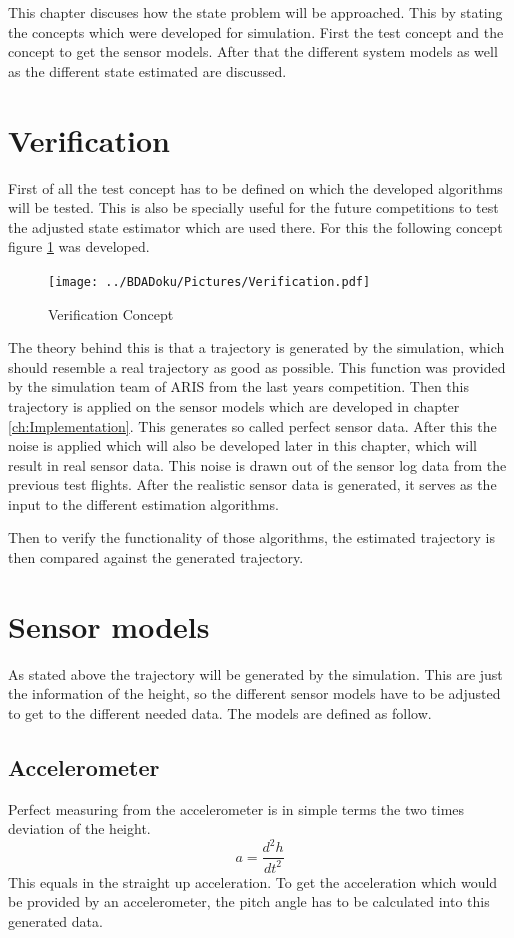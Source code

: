
  This chapter discuses how the state problem will be approached.
  This by stating the concepts which were developed for simulation.
  First the test concept and the concept to get the sensor models.
  After that the different system models as well as the different state estimated are discussed.
  
  \section{Verification}
  First of all the test concept has to be defined on which the developed algorithms will be tested.
  This is also be specially useful for the future competitions to test the adjusted state estimator which are used there.
  For this the following concept figure \ref{fig:Verification} was developed.
  
  \begin{figure}[h!]
   \centering
   \texttt{[image: ../BDADoku/Pictures/Verification.pdf]}
   \caption{Verification Concept}
   \label{fig:Verification}
  \end{figure}

  The theory behind this is that a trajectory is generated by the simulation, which should resemble a real trajectory as good as possible.
  This function was provided by the simulation team of ARIS from the last years competition.
  Then this trajectory is applied on the sensor models which are developed in chapter \ref{ch:Implementation}.
  This generates so called perfect sensor data. 
  After this the noise is applied which will also be developed later in this chapter, which will result in real sensor data. 
  This noise is drawn out of the sensor log data from the previous test flights.
  After the realistic sensor data is generated, it serves as the input to the different estimation algorithms.
  
  Then to verify the functionality of those algorithms, the estimated trajectory is then compared against the generated trajectory.
  
  
  \section{Sensor models}
  As stated above the trajectory will be generated by the simulation. 
  This are just the information of the height, so the different sensor models have to be adjusted to get to the different needed data.
  The models are defined as follow.
  
  \subsection{Accelerometer}
  Perfect measuring from the accelerometer is in simple terms the two times deviation of the height.
  $$a = \frac{d^2h}{dt^2}$$
  This equals in the straight up acceleration. To get the acceleration which would be provided by an accelerometer,
  the pitch angle has to be calculated into this generated data.
  
